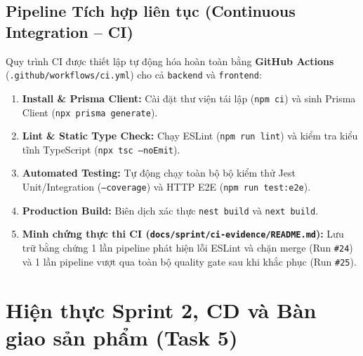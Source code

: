 \documentclass[a4paper,12pt]{article}
\begin{document}
\subsection{Pipeline Tích hợp liên tục (Continuous Integration -- CI)}
Quy trình CI được thiết lập tự động hóa hoàn toàn bằng \textbf{GitHub Actions} (\texttt{.github/workflows/ci.yml}) cho cả \texttt{backend} và \texttt{frontend}:
\begin{enumerate}[1.]
  \item \textbf{Install \& Prisma Client:} Cài đặt thư viện tái lập (\texttt{npm ci}) và sinh Prisma Client (\texttt{npx prisma generate}).
  \item \textbf{Lint \& Static Type Check:} Chạy ESLint (\texttt{npm run lint}) và kiểm tra kiểu tĩnh TypeScript (\texttt{npx tsc --noEmit}).
  \item \textbf{Automated Testing:} Tự động chạy toàn bộ bộ kiểm thử Jest Unit/Integration (\texttt{--coverage}) và HTTP E2E (\texttt{npm run test:e2e}).
  \item \textbf{Production Build:} Biên dịch xác thực \texttt{nest build} và \texttt{next build}.
  \item \textbf{Minh chứng thực thi CI (\texttt{docs/sprint/ci-evidence/README.md}):} Lưu trữ bằng chứng 1 lần pipeline phát hiện lỗi ESLint và chặn merge (Run \texttt{\#24}) và 1 lần pipeline vượt qua toàn bộ quality gate sau khi khắc phục (Run \texttt{\#25}).
\end{enumerate}

\newpage
\section{Hiện thực Sprint 2, CD và Bàn giao sản phẩm (Task 5)}
\end{document}
